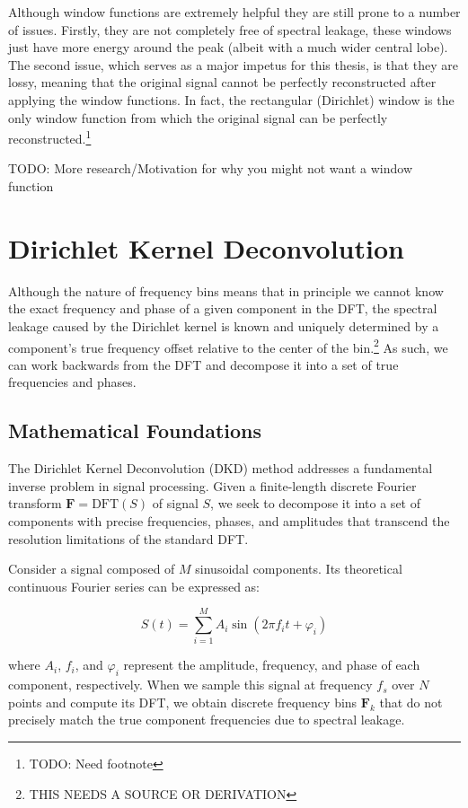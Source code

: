 \documentclass[11pt,twoside]{report}
\numberwithin{thm}{section}
\numberwithin{equation}{section}
\begin{document}
Although window functions are extremely helpful they are still prone to a number of issues. Firstly, they are not completely free of spectral leakage, these windows just have more energy around the peak (albeit with a much wider central lobe). The second issue, which serves as a major impetus for this thesis, is that they are lossy, meaning that the original signal cannot be perfectly reconstructed after applying the window functions. In fact, the rectangular (Dirichlet) window is the only window function from which the original signal can be perfectly reconstructed.\footnote{TODO: Need footnote}

TODO: More research/Motivation for why you might not want a window function

\chapter{Dirichlet Kernel Deconvolution}
Although the nature of frequency bins means that in principle we cannot know the exact frequency and phase of a given component in the DFT, the spectral leakage caused by the Dirichlet kernel is known and uniquely determined by a component's true frequency offset relative to the center of the bin.\footnote{THIS NEEDS A SOURCE OR DERIVATION} As such, we can work backwards from the DFT and decompose it into a set of true frequencies and phases. \\

\section{Mathematical Foundations}
\label{subsec:mathematical_foundations}

The Dirichlet Kernel Deconvolution (DKD) method addresses a fundamental inverse problem in signal processing. Given a finite-length discrete Fourier transform $\mathbf{F} = \text{DFT}(S)$ of signal $S$, we seek to decompose it into a set of components with precise frequencies, phases, and amplitudes that transcend the resolution limitations of the standard DFT.

Consider a signal composed of $M$ sinusoidal components. Its theoretical continuous Fourier series can be expressed as:

\begin{equation}
\label{eq:continuous_signal}
S(t) = \sum_{i=1}^{M} A_i \sin(2\pi f_i t + \varphi_i)
\end{equation}

where $A_i$, $f_i$, and $\varphi_i$ represent the amplitude, frequency, and phase of each component, respectively. When we sample this signal at frequency $f_s$ over $N$ points and compute its DFT, we obtain discrete frequency bins $\mathbf{F}_k$ that do not precisely match the true component frequencies due to spectral leakage.
\end{document}
